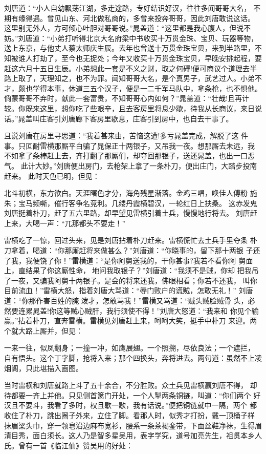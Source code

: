 刘唐道：“小人自幼飘荡江湖，多走途路，专好结识好汉，往往多闻哥哥大名，
不期有缘得遇。曾见山东、河北做私商的，多曾来投奔哥哥，因此刘唐敢说这话。
这里别无外人，方可倾心吐胆对哥哥说。”晁盖道：“这里都是我心腹人，但说不
妨。”刘唐道：“小弟打听得北京大名府梁中书收买十万贯金珠、宝贝、玩器等物，
送上东京，与他丈人蔡太师庆生辰。去年也曾送十万贯金珠宝贝，来到半路里，不
知被谁人打劫了，至今也无捉处；今年又收买十万贯金珠宝贝，早晚安排起程，要
赶这六月十五日生辰。小弟想此一套是不义之财，取之何碍!便可商议个道理去半
路上取了，天理知之，也不为罪。闻知哥哥大名，是个真男子，武艺过人。小弟不
才，颇也学得本事，休道三五个汉子，便是一二千军马队中，拿条枪，也不惧他。
倘蒙哥哥不弃时，献此一套富贵，不知哥哥心内如何？”晁盖道：“壮哉!且再计
较。你既来这里，想你吃了些艰辛，且去客房里将息少歇，待我从长商议，来日说
话。”晁盖叫庄客引刘唐廊下客房里歇息，庄客引到房中，也自去干事了。

且说刘唐在房里寻思道：“我着甚来由，苦恼这遭!多亏晁盖完成，解脱了这
件事。只叵耐雷横那厮平白骗了晁保正十两银子，又吊我一夜。想那厮去未远，我
不如拿了条棒赶上去，齐打翻了那厮们，却夺回那银子，送还晁盖，也出一口恶气。
此计大妙。”刘唐便出房门，去枪架上拿了一条朴刀，便出庄门，大踏步投南赶来。
此时天色已明，但见：

北斗初横，东方欲白。天涯曙色才分，海角残星渐落。金鸡三唱，唤佳人傅粉
施朱；宝马频嘶，催行客争名竞利。几缕丹霞横碧汉，一轮红日上扶桑。
这赤发鬼刘唐挺着朴刀，赶了五六里路，却早望见雷横引着土兵，慢慢地行将去。
刘唐赶上来，大喝一声：“兀那都头不要走！”

雷横吃了一惊，回过头来，见是刘唐拈着朴刀赶来。雷横慌忙去土兵手里夺条
朴刀拿着，喝道：“你那厮赶将来做甚么？”刘唐道：“你晓事的，留下那十两银
子还了我，我便饶了你！”雷横道：“是你阿舅送我的，干你甚事?我若不看你阿
舅面上，直结果了你这厮性命，地问我取银子？”刘唐道：“我须不是贼，你却
把我吊了一夜，又骗我阿舅十两银子。是会的将来还我，佛眼相看；你若不还我，
叫你目前流血！”雷横大怒，指着刘唐大骂道：“辱门败户的谎贼，怎敢无礼！”
刘唐道：“你那作害百姓的腌泼才，怎敢骂我！”雷横又骂道：“贼头贼脸贼骨
头，必然要连累晁盖!你这等贼心贼肝，我行须使不得！”刘唐大怒道：“我来和
你见个输赢。”拈着朴刀，直奔雷横。雷横见刘唐赶上来，呵呵大笑，挺手中朴刀
来迎。两个就大路上厮并，但见：

一来一往，似凤翻身；一撞一冲，如鹰展翅。一个照搠，尽依良法；一个遮拦，
自有悟头。这个丁字脚，抢将入来；那个四换头，奔将进去。两句道：虽然不上凌
烟阁，只此堪描入画图。

当时雷横和刘唐就路上斗了五十余合，不分胜败。众土兵见雷横赢刘唐不得，
却待都要一齐上并他。只见侧首篱门开处，一个人掣两条铜链，叫道：“你们两个
好汉且不要斗，我看了多时，权且歇一歇，我有话说。”便把铜链就中一隔，两个
都收住了朴刀，跳出圈子外来，立住了脚。看那人时，似秀才打扮，戴一顶桶子样
抹眉梁头巾，穿一领皂沿边麻布宽衫，腰系一条茶褐銮带，下面丝鞋净袜，生得眉
清目秀，面白须长。这人乃是智多星吴用，表字学究，道号加亮先生，祖贯本乡人
氏。曾有一首《临江仙》赞吴用的好处：

